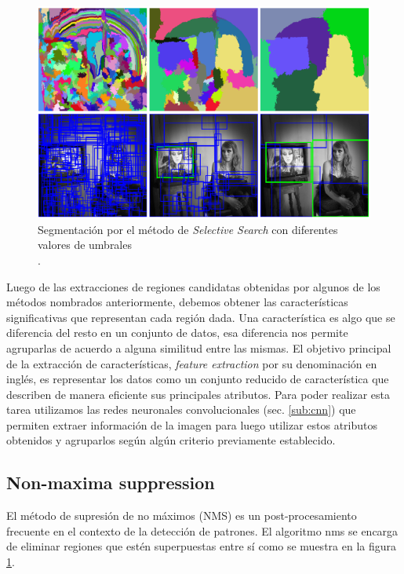 \begin{figure}[H]
 \centering
  \includegraphics[scale=0.4,keepaspectratio=true,clip=true]{imagenes/MarcoTeorico/selectivesearch.png}
  \caption{Segmentación por el método de \textit{Selective Search} con diferentes valores de umbrales \\ \citep{selectivesearch}.}
	\label{Fig: overlapping}
\end{figure}

Luego de las extracciones de regiones candidatas obtenidas por algunos de los métodos nombrados anteriormente, debemos obtener las características significativas que representan cada región dada. Una  característica es algo que se diferencia del resto en un conjunto de datos, esa diferencia nos permite agruparlas de acuerdo a alguna similitud entre las mismas. El objetivo principal de la  extracción de características, \textit{feature extraction} por su denominación en inglés, es representar los datos como un conjunto reducido de característica que describen de manera eficiente sus principales atributos. Para poder realizar esta tarea utilizamos  las redes neuronales convolucionales (sec. \ref{sub:cnn}) que  permiten extraer información de la imagen para luego utilizar estos atributos obtenidos y agruparlos según algún criterio previamente establecido. 




\subsection{Non-maxima suppression}\label{sub:nonmaximumsuppression}

El método de supresión de no máximos (NMS) es un post-procesamiento frecuente en el contexto de la detección de patrones. El algoritmo  \ac{nms} se encarga de eliminar regiones que estén superpuestas entre sí como se muestra en la figura  \ref{Fig: overlapping}.

